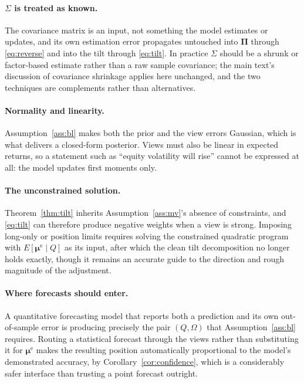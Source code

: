 \documentclass[11pt]{article}
\theoremstyle{remark}
\theoremstyle{definition}
\begin{document}
\paragraph{$\Sigma$ is treated as known.} The covariance matrix is an input, not something the model estimates or updates, and its own estimation error propagates untouched into $\boldsymbol\Pi$ through \eqref{eq:reverse} and into the tilt through \eqref{eq:tilt}. In practice $\Sigma$ should be a shrunk or factor-based estimate rather than a raw sample covariance; the main text's discussion of covariance shrinkage applies here unchanged, and the two techniques are complements rather than alternatives.

\paragraph{Normality and linearity.} Assumption~\ref{ass:bl} makes both the prior and the view errors Gaussian, which is what delivers a closed-form posterior. Views must also be linear in expected returns, so a statement such as ``equity volatility will rise'' cannot be expressed at all: the model updates first moments only.

\paragraph{The unconstrained solution.} Theorem~\ref{thm:tilt} inherits Assumption~\ref{ass:mv}'s absence of constraints, and \eqref{eq:tilt} can therefore produce negative weights when a view is strong. Imposing long-only or position limits requires solving the constrained quadratic program with $E[\boldsymbol\mu^{\mathrm{e}}\mid Q]$ as its input, after which the clean tilt decomposition no longer holds exactly, though it remains an accurate guide to the direction and rough magnitude of the adjustment.

\paragraph{Where forecasts should enter.} A quantitative forecasting model that reports both a prediction and its own out-of-sample error is producing precisely the pair $(Q,\Omega)$ that Assumption~\ref{ass:bl} requires. Routing a statistical forecast through the views rather than substituting it for $\boldsymbol\mu^{\mathrm{e}}$ makes the resulting position automatically proportional to the model's demonstrated accuracy, by Corollary~\ref{cor:confidence}, which is a considerably safer interface than trusting a point forecast outright.
\end{document}
